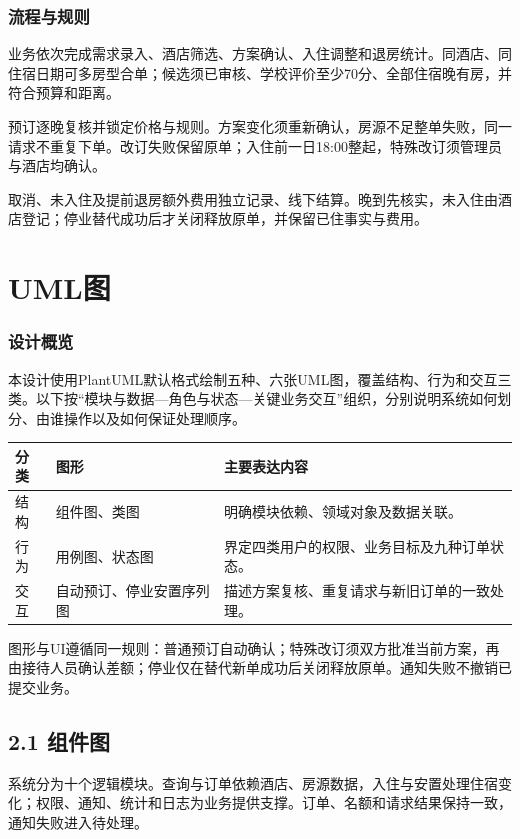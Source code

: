 \documentclass[UTF8]{ctexart}
\newcommand{\ReportPage}{\clearpage}
\begin{document}
\subsubsection*{流程与规则}
业务依次完成需求录入、酒店筛选、方案确认、入住调整和退房统计。同酒店、同住宿日期可多房型合单；候选须已审核、学校评价至少70分、全部住宿晚有房，并符合预算和距离。

预订逐晚复核并锁定价格与规则。方案变化须重新确认，房源不足整单失败，同一请求不重复下单。改订失败保留原单；入住前一日18:00整起，特殊改订须管理员与酒店均确认。

取消、未入住及提前退房额外费用独立记录、线下结算。晚到先核实，未入住由酒店登记；停业替代成功后才关闭释放原单，并保留已住事实与费用。


\ReportPage
\section{UML图}\label{part:uml}
\subsubsection*{设计概览}
本设计使用PlantUML默认格式绘制五种、六张UML图，覆盖结构、行为和交互三类。以下按“模块与数据—角色与状态—关键业务交互”组织，分别说明系统如何划分、由谁操作以及如何保证处理顺序。

{
\noindent\begin{tabularx}{\linewidth}{@{}p{18mm}p{45mm}Y@{}}
\toprule
\textbf{分类} & \textbf{图形} & \textbf{主要表达内容} \\
\midrule
结构 & 组件图、类图 & 明确模块依赖、领域对象及数据关联。 \\
行为 & 用例图、状态图 & 界定四类用户的权限、业务目标及九种订单状态。 \\
交互 & 自动预订、停业安置序列图 & 描述方案复核、重复请求与新旧订单的一致处理。 \\
\bottomrule
\end{tabularx}\par
}
图形与UI遵循同一规则：普通预订自动确认；特殊改订须双方批准当前方案，再由接待人员确认差额；停业仅在替代新单成功后关闭释放原单。通知失败不撤销已提交业务。


\ReportPage
{}
\subsection*{2.1 组件图}
系统分为十个逻辑模块。查询与订单依赖酒店、房源数据，入住与安置处理住宿变化；权限、通知、统计和日志为业务提供支撑。订单、名额和请求结果保持一致，通知失败进入待处理。
\end{document}
